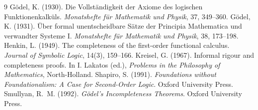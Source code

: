 \documentclass{situationist-preprint}
\begin{document}
\begin{thebibliography}{9}\small
{} G\"odel, K. (1930). Die Vollst\"andigkeit der Axiome des logischen Funktionenkalk\"uls. \emph{Monatshefte f\"ur Mathematik und Physik}, 37, 349--360.
 G\"odel, K. (1931). \"Uber formal unentscheidbare S\"atze der Principia Mathematica und verwandter Systeme I. \emph{Monatshefte f\"ur Mathematik und Physik}, 38, 173--198.
 Henkin, L. (1949). The completeness of the first-order functional calculus. \emph{Journal of Symbolic Logic}, 14(3), 159--166.
 Kreisel, G. (1967). Informal rigour and completeness proofs. In I. Lakatos (ed.), \emph{Problems in the Philosophy of Mathematics}, North-Holland.
 Shapiro, S. (1991). \emph{Foundations without Foundationalism: A Case for Second-Order Logic}. Oxford University Press.
 Smullyan, R.~M. (1992). \emph{G\"odel's Incompleteness Theorems}. Oxford University Press.
\end{thebibliography}
\end{document}
